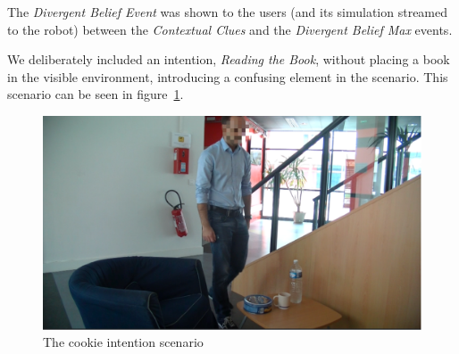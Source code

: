 The \textit{Divergent Belief Event} was shown to the users (and its simulation streamed to the robot) between the \textit{Contextual Clues} and the \textit{Divergent Belief Max} events. 


We deliberately included an intention, \textit{Reading the Book}, without placing a book in the visible environment, introducing a confusing element in the scenario. This scenario can be seen in figure~\ref{fig:situation_assessment-cookie}.


 \begin{figure}[ht!]
	\centering
	\includegraphics[scale=0.5]{img/situation_assessment/cookie1-blur.pdf}
	\caption{The cookie intention scenario}
	\label{fig:situation_assessment-cookie}
\end{figure}


